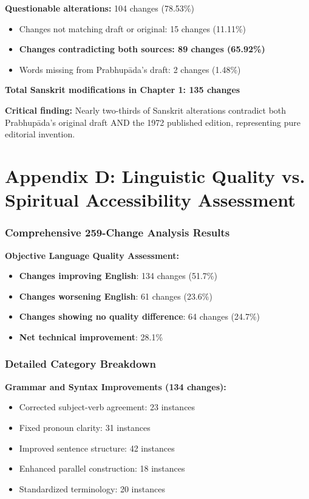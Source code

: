 \documentclass[11pt,twoside]{book}
\begin{document}
\textbf{\textbf{Questionable alterations:}} 104 changes (78.53\%)  
\begin{itemize}
\item Changes not matching draft or original: 15 changes (11.11\%)
\item \textbf{\textbf{Changes contradicting both sources: 89 changes (65.92\%)}}
\item Words missing from Prabhupāda's draft: 2 changes (1.48\%)
\end{itemize}

\textbf{\textbf{Total Sanskrit modifications in Chapter 1: 135 changes}}

\textbf{\textbf{Critical finding:}} Nearly two-thirds of Sanskrit alterations contradict both Prabhupāda's original draft AND the 1972 published edition, representing pure editorial invention.
\part*{Appendix D: Linguistic Quality vs. Spiritual Accessibility Assessment}
\label{sec:orgee26df1}
\thispagestyle{plain}
\section*{Comprehensive 259-Change Analysis Results}
\label{sec:org04e151d}

\textbf{\textbf{Objective Language Quality Assessment:}}
\begin{itemize}
\item \textbf{\textbf{Changes improving English}}: 134 changes (51.7\%)
\item \textbf{\textbf{Changes worsening English}}: 61 changes (23.6\%)
\item \textbf{\textbf{Changes showing no quality difference}}: 64 changes (24.7\%)
\item \textbf{\textbf{Net technical improvement}}: 28.1\%
\end{itemize}
\section*{Detailed Category Breakdown}
\label{sec:org4c630d3}

\textbf{\textbf{Grammar and Syntax Improvements (134 changes):}}
\begin{itemize}
\item Corrected subject-verb agreement: 23 instances
\item Fixed pronoun clarity: 31 instances
\item Improved sentence structure: 42 instances
\item Enhanced parallel construction: 18 instances
\item Standardized terminology: 20 instances
\end{itemize}
\end{document}

